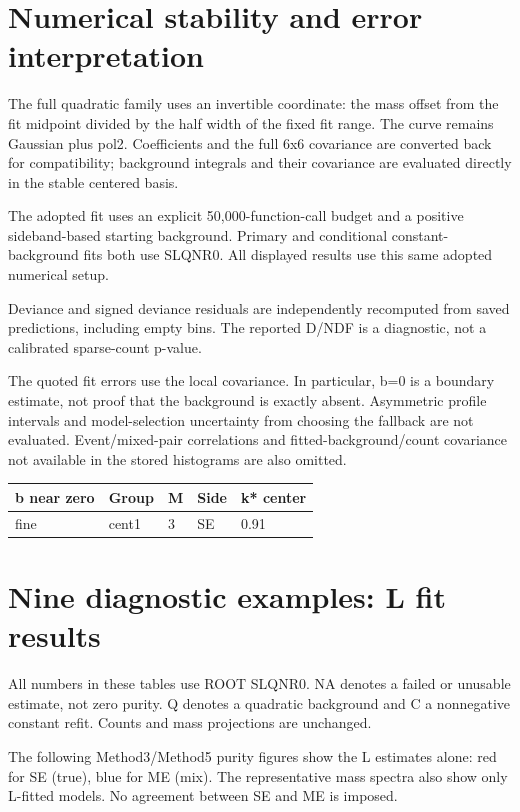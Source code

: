 \documentclass[10pt,a4paper]{article}
\begin{document}
\section*{Numerical stability and error interpretation}
The full quadratic family uses an invertible coordinate: the mass offset from the fit midpoint divided by the half width of the fixed fit range. The curve remains Gaussian plus pol2. Coefficients and the full 6x6 covariance are converted back for compatibility; background integrals and their covariance are evaluated directly in the stable centered basis.

The adopted fit uses an explicit 50,000-function-call budget and a positive sideband-based starting background. Primary and conditional constant-background fits both use SLQNR0. All displayed results use this same adopted numerical setup.

Deviance and signed deviance residuals are independently recomputed from saved predictions, including empty bins. The reported D/NDF is a diagnostic, not a calibrated sparse-count p-value.

The quoted fit errors use the local covariance. In particular, b=0 is a boundary estimate, not proof that the background is exactly absent. Asymmetric profile intervals and model-selection uncertainty from choosing the fallback are not evaluated. Event/mixed-pair correlations and fitted-background/count covariance not available in the stored histograms are also omitted.

{\small\setlength{\tabcolsep}{3pt}\begin{longtable}{lllll}\toprule
b near zero & Group & M & Side & k* center\\\midrule\endhead
fine & cent1 & 3 & SE & 0.91\\
\bottomrule\end{longtable}}
\clearpage
\section*{Nine diagnostic examples: L fit results}
All numbers in these tables use ROOT SLQNR0. NA denotes a failed or unusable estimate, not zero purity. Q denotes a quadratic background and C a nonnegative constant refit. Counts and mass projections are unchanged.

The following Method3/Method5 purity figures show the L estimates alone: red for SE (true), blue for ME (mix). The representative mass spectra also show only L-fitted models. No agreement between SE and ME is imposed.
\end{document}
